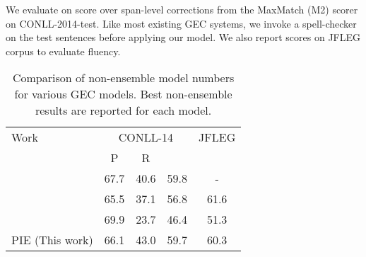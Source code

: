 \documentclass[11pt,a4paper]{article}
\begin{document}
We evaluate on  score over span-level corrections from the
MaxMatch (M2) scorer \cite{dahlmeier2012better} on CONLL-2014-test.
Like most existing GEC systems, we invoke a spell-checker on the test sentences before applying our model.
We also report  \cite{napoles2016gleu} scores on JFLEG corpus \cite{napoles-sakaguchi-tetreault:2017:EACLshort} to evaluate fluency. 
\begin{table}[H]
\centering
\begin{tabular}{|p{2.5cm}|c|c|c|c|}
\hline
Work & \multicolumn{3}{c|}{CONLL-14} & JFLEG \\ \cline{2-5} 
                      & P       & R       &     &  \\ \hline
{\scriptsize \citet{zhao2019improving}}                  & 67.7    & 40.6    & 59.8      & -     \\ \hline
{\scriptsize \citet{lichtarge2019}}             & 65.5    & 37.1    & 56.8      & 61.6  \\ \hline
{\scriptsize \citet{chollampatt2018mlconv}}                  & 69.9    & 23.7    & 46.4      & 51.3  \\ \hline
PIE (This work)             & 66.1    & 43.0    & 59.7      & 60.3  \\ \hline
\end{tabular}
\caption{Comparison of non-ensemble model numbers for various GEC models. Best non-ensemble results are reported for each model.}
\label{tab:single_model_conll14}
\end{table}
\end{document}
